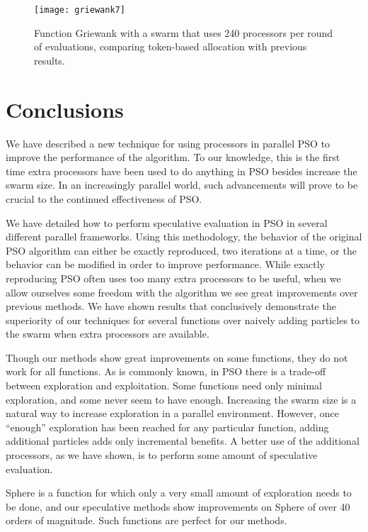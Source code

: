 \documentclass[journal,letterpaper]{IEEEtran}
\begin{document}
\begin{figure}
  \centering
  \texttt{[image: griewank7]}
  \caption{Function Griewank with a swarm that uses 240 processors per round of
  evaluations, comparing token-based allocation with previous results.}
  \label{fig:griewank-token}
\end{figure}

\section{Conclusions}
\label{sec:conclusion}

We have described a new technique for using processors in parallel PSO to
improve the performance of the algorithm.  To our knowledge, this is the first
time extra processors have been used to do anything in PSO besides increase the
swarm size.  In an increasingly parallel world, such advancements will prove to
be crucial to the continued effectiveness of PSO.

We have detailed how to perform speculative evaluation in PSO in several
different parallel frameworks.  Using this methodology, the behavior of the
original PSO algorithm can either be exactly reproduced, two iterations at a
time, or the behavior can be modified in order to improve performance.  While
exactly reproducing PSO often uses too many extra processors to be useful, when
we allow ourselves some freedom with the algorithm we see great improvements
over previous methods.  We have shown results that conclusively demonstrate the
superiority of our techniques for several functions over naively adding
particles to the swarm when extra processors are available.

Though our methods show great improvements on some functions, they do not work
for all functions.  As is commonly known, in PSO there is a trade-off between
exploration and exploitation.  Some functions need only minimal exploration,
and some never seem to have enough.  Increasing the swarm size is a natural way
to increase exploration in a parallel environment.  However, once ``enough''
exploration has been reached for any particular function, adding additional
particles adds only incremental benefits.  A better use of the additional
processors, as we have shown, is to perform some amount of speculative
evaluation.

Sphere is a function for which only a very small amount of exploration needs to
be done, and our speculative methods show improvements on Sphere of over 40
orders of magnitude.  Such functions are perfect for our methods.
\end{document}
